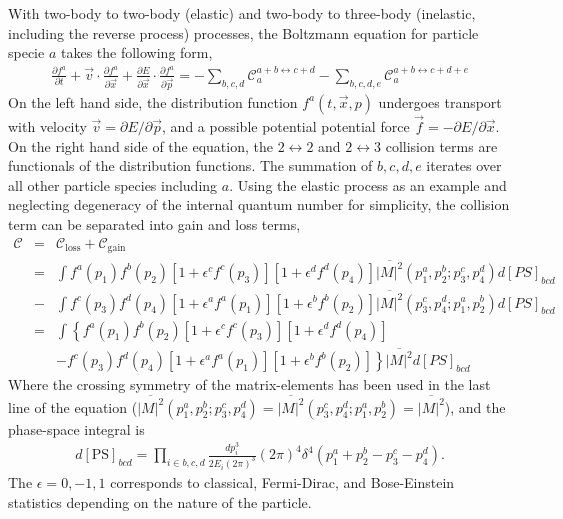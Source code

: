 With two-body to two-body (elastic) and two-body to three-body (inelastic, including the reverse process) processes, the Boltzmann equation for particle specie $a$ takes the following form,
\begin{eqnarray}
\frac{\partial f^a}{\partial t} + \vec{v}\cdot\frac{\partial f^a}{\partial \vec{x}} + \frac{\partial E}{\partial \vec{x}}\cdot\frac{\partial f^{a}}{\partial \vec{p}} = - \sum_{b,c,d}\mathcal{C}_a^{a+b\leftrightarrow c+d}- \sum_{b,c,d,e}\mathcal{C}_a^{a+b\leftrightarrow c+d+e}
\end{eqnarray}
On the left hand side, the distribution function $f^{a}(t, \vec{x}, p)$ undergoes transport with velocity $\vec{v} = \partial E/\partial \vec{p}$, and a possible potential potential force $\vec{f} = -\partial E/\partial \vec{x}$.
On the right hand side of the equation, the $2\leftrightarrow 2$ and $2\leftrightarrow 3$ collision terms are functionals of the distribution functions.
The summation of $b,c,d,e$ iterates over all other particle species including $a$.
Using the elastic process as an example and neglecting degeneracy of the internal quantum number for simplicity, the collision term can be separated into gain and loss terms,
\begin{eqnarray}
\mathcal{C} &=& \mathcal{C}_\textrm{loss} + \mathcal{C}_\textrm{gain}\\
&=& \int f^a(p_1)f^b(p_2)[1+\epsilon^c f^c(p_3)][1+\epsilon^d f^d(p_4)] \overline{|M|^2}(p_1^a, p_2^b; p_3^c, p_4^d) d[PS]_{bcd} \\\nonumber
&-& \int f^c(p_3)f^d(p_4)[1+\epsilon^a f^a(p_1)][1+\epsilon^b f^b(p_2)] \overline{|M|^2}(p_3^c, p_4^d; p_1^a, p_2^b) d[PS]_{bcd} \\
&=& \int \left\{
f^a(p_1)f^b(p_2)[1+\epsilon^c f^c(p_3)][1+\epsilon^d f^d(p_4)] \right. \label{eq:collision-term:symmetry} \\\nonumber
&& \left.- f^c(p_3)f^d(p_4)[1+\epsilon^a f^a(p_1)][1+\epsilon^b f^b(p_2)]\right\}
\overline{|M|^2} d[PS]_{bcd} 
\end{eqnarray}
Where the crossing symmetry of the matrix-elements has been used in the last line of the equation ($\overline{|M|^2}(p_1^a, p_2^b; p_3^c, p_4^d) = \overline{|M|^2}(p_3^c, p_4^d; p_1^a, p_2^b) = \overline{|M|^2}$), and the phase-space integral is 
\begin{eqnarray}
d[\textrm{PS}]_{bcd} = \prod_{i\in {b,c,d}}\frac{dp_i^3}{2E_i (2\pi)^3} (2\pi)^4 \delta^{4}(p^a_1+p^b_2 - p^c_3-p^d_4).
\end{eqnarray}
The $\epsilon = 0, -1, 1$ corresponds to classical, Fermi-Dirac, and Bose-Einstein statistics depending on the nature of the particle.
